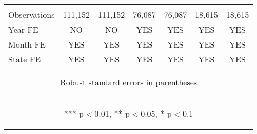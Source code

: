 \begin{center}
\begin{tabular}{lcccccc}
\vspace{4pt} & \begin{footnotesize}\end{footnotesize} & \begin{footnotesize}\end{footnotesize} & \begin{footnotesize}\end{footnotesize} & \begin{footnotesize}\end{footnotesize} & \begin{footnotesize}\end{footnotesize} & \begin{footnotesize}\end{footnotesize} \\
Observations & 111,152 & 111,152 & 76,087 & 76,087 & 18,615 & 18,615 \\
Year FE & NO & NO & YES & YES & YES & YES \\
Month FE & YES & YES & YES & YES & YES & YES \\
 State FE & YES & YES & YES & YES & YES & YES \\ \hline
\multicolumn{7}{c}{\begin{footnotesize} Robust standard errors in parentheses\end{footnotesize}} \\
\multicolumn{7}{c}{\begin{footnotesize} *** p$<$0.01, ** p$<$0.05, * p$<$0.1\end{footnotesize}} \\
\end{tabular}
\end{center}
